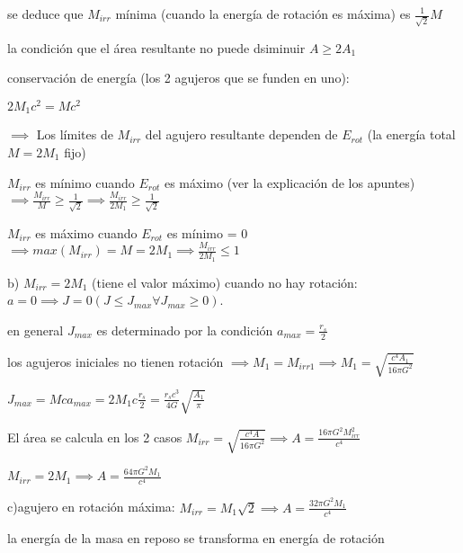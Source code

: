 \documentclass[12pt]{book}
\begin{document}
se deduce que $M_{irr} $ mínima (cuando la energía de rotación es máxima) es $\frac{1}{\sqrt{2}} M$

la condición que el área resultante no puede dsiminuir $A \ge 2 A_1$

conservación de energía (los 2 agujeros que se funden en uno):

$2 M_1 c^2 = M c^2$

$\implies$ Los límites de $M_{irr}$ del agujero resultante dependen de $E_{rot}$ (la energía total $M = 2M_1$ fijo)

$M_{irr}$ es mínimo cuando $E_{rot}$ es máximo (ver la explicación de los apuntes)
$\implies \frac{M_{irr}}{M} \ge \frac{1}{\sqrt{2}} \implies \frac{M_{irr}}{2M_1} \ge \frac{1}{\sqrt{2}} $

$M_{irr}$ es máximo cuando $E_{rot}$ es mínimo = 0 $\implies max(M_{irr}) = M = 2 M_1 \implies \frac{M_{irr}}{2 M_1}\le 1$

b) $M_{irr} = 2 M_1$ (tiene el valor máximo) cuando no hay rotación: $a= 0 \implies J = 0 (J \le J_{max} \forall J_{max} \ge 0)$. 

en general $J_{max}$ es determinado por la condición $a_{max} = \frac{r_s}{2}$

los agujeros iniciales no tienen rotación $\implies M_1 = M_{irr1} \implies M_1 =  \sqrt{\frac{c^4 A_1}{16 \pi G^2}}$

$J_{max} = M c a_{max} = 2 M_1 c \frac{r_s}{2}  = \frac{r_s c^3}{4G} \sqrt{\frac{A_1}{\pi}}$

El área se calcula en los 2 casos $M_{irr} = \sqrt{\frac{c^4 A}{16 \pi G^2}} \implies A = \frac{16 \pi G^2 M_{irr}^2}{c^4}$

$M_{irr} = 2 M_1 \implies A = \frac{64 \pi G^2 M_1}{c^4}$

c)agujero en rotación máxima: $M_{irr} = M_1 \sqrt{2} \implies A = \frac{32 \pi G^2 M_1}{c^4}$

la energía de la masa en reposo se transforma en energía de rotación
\end{document}
